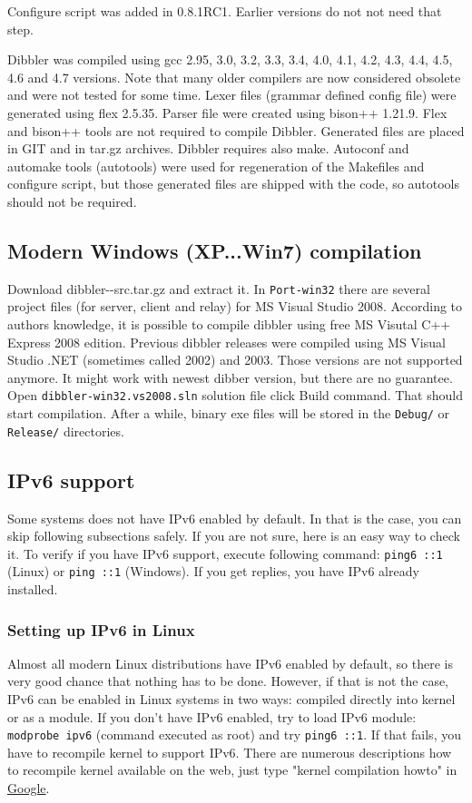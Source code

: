 Configure script was added in 0.8.1RC1. Earlier versions do not not
need that step.

Dibbler was compiled using gcc 2.95, 3.0, 3.2, 3.3, 3.4, 4.0, 4.1,
4.2, 4.3, 4.4, 4.5, 4.6 and 4.7 versions. Note that many older compilers are
now considered obsolete and were not tested for some time. Lexer files
(grammar defined config file) were generated using flex 2.5.35. Parser
file were created using bison++ 1.21.9. Flex and bison++ tools are not
required to compile Dibbler. Generated files are placed in GIT and in
tar.gz archives. Dibbler requires also make. Autoconf and automake
tools (autotools) were used for regeneration of the Makefiles and
configure script, but those generated files are shipped with the code,
so autotools should not be required.

\subsection{Modern Windows (XP...Win7) compilation}
Download dibbler-\version-src.tar.gz and extract it. In
\verb+Port-win32+ there are several project files (for server, client
and relay) for MS Visual Studio 2008. According to authors knowledge,
it is possible to compile dibbler using free MS Visutal C++ Express
2008 edition. Previous dibbler releases were compiled using MS Visual
Studio .NET (sometimes called 2002) and 2003. Those versions are not
supported anymore. It might work with newest dibber version, but there
are no guarantee. Open \verb+dibbler-win32.vs2008.sln+ solution file
click Build command. That should start compilation. After a while,
binary exe files will be stored in the \verb+Debug/+ or
\verb+Release/+ directories.

\subsection{IPv6 support}
Some systems does not have IPv6 enabled by default. In that is the case,
you can skip following subsections safely. If you are not sure, here is
an easy way to check it. To verify if you have IPv6 support, execute
following command: \verb+ping6 ::1+ (Linux) or \verb+ping ::1+
(Windows). If you get replies, you have IPv6 already installed.

\subsubsection{Setting up IPv6 in Linux}
Almost all modern Linux distributions have IPv6 enabled by default, so there
is very good chance that nothing has to be done. However, if that is
not the case, IPv6 can be enabled in Linux systems in two ways:
compiled directly into kernel or as a module. If you don't have IPv6
enabled, try to load IPv6 module: \verb+modprobe ipv6+ (command
executed as root) and try \verb+ping6 ::1+. If that fails, you have to
recompile kernel to support IPv6. There are numerous descriptions how
to recompile kernel available on the web, just type "kernel
compilation howto" in \href{http://www.google.com}{Google}.

